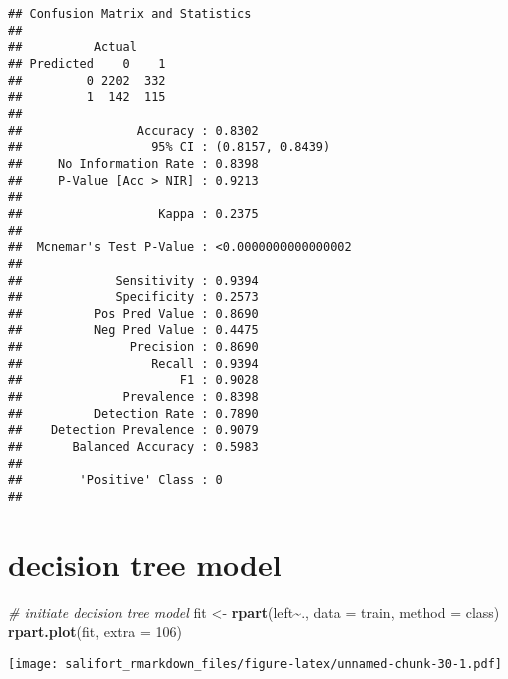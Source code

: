 \documentclass[
]{article}
\newenvironment{Shaded}{\begin{snugshade}}{\end{snugshade}}
\newcommand{\AttributeTok}[1]{\textcolor[rgb]{0.13,0.29,0.53}{#1}}
\newcommand{\CommentTok}[1]{\textcolor[rgb]{0.56,0.35,0.01}{\textit{#1}}}
\newcommand{\DecValTok}[1]{\textcolor[rgb]{0.00,0.00,0.81}{#1}}
\newcommand{\FunctionTok}[1]{\textcolor[rgb]{0.13,0.29,0.53}{\textbf{#1}}}
\newcommand{\NormalTok}[1]{#1}
\newcommand{\OtherTok}[1]{\textcolor[rgb]{0.56,0.35,0.01}{#1}}
\newcommand{\SpecialCharTok}[1]{\textcolor[rgb]{0.81,0.36,0.00}{\textbf{#1}}}
\newcommand{\StringTok}[1]{\textcolor[rgb]{0.31,0.60,0.02}{#1}}
\begin{document}
\begin{verbatim}
## Confusion Matrix and Statistics
## 
##          Actual
## Predicted    0    1
##         0 2202  332
##         1  142  115
##                                              
##                Accuracy : 0.8302             
##                  95% CI : (0.8157, 0.8439)   
##     No Information Rate : 0.8398             
##     P-Value [Acc > NIR] : 0.9213             
##                                              
##                   Kappa : 0.2375             
##                                              
##  Mcnemar's Test P-Value : <0.0000000000000002
##                                              
##             Sensitivity : 0.9394             
##             Specificity : 0.2573             
##          Pos Pred Value : 0.8690             
##          Neg Pred Value : 0.4475             
##               Precision : 0.8690             
##                  Recall : 0.9394             
##                      F1 : 0.9028             
##              Prevalence : 0.8398             
##          Detection Rate : 0.7890             
##    Detection Prevalence : 0.9079             
##       Balanced Accuracy : 0.5983             
##                                              
##        'Positive' Class : 0                  
## 
\end{verbatim}

\section{decision tree model}\label{decision-tree-model}

\begin{Shaded}
\begin{Highlighting}[]
\CommentTok{\# initiate decision tree model}
\NormalTok{fit }\OtherTok{\textless{}{-}} \FunctionTok{rpart}\NormalTok{(left}\SpecialCharTok{\textasciitilde{}}\NormalTok{., }\AttributeTok{data =}\NormalTok{ train, }\AttributeTok{method =} \StringTok{\textquotesingle{}class\textquotesingle{}}\NormalTok{)}
\FunctionTok{rpart.plot}\NormalTok{(fit, }\AttributeTok{extra =} \DecValTok{106}\NormalTok{)}
\end{Highlighting}
\end{Shaded}

\texttt{[image: salifort\_rmarkdown\_files/figure-latex/unnamed-chunk-30-1.pdf]}

\begin{Shaded}
\end{Shaded}
\end{document}

